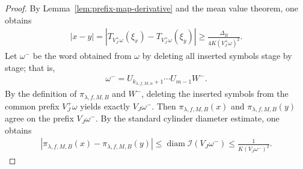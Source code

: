 \documentclass[10pt,a4paper]{amsart}
\begin{document}
\begin{proof}
By Lemma~\ref{lem:prefix-map-derivative} and the mean value theorem, one obtains
\begin{align}
\label{eq:x-y-lower-local-holder-revised}
    \left|x-y\right|
    =
    \left|T_{V^+_J\omega}(\xi_x)-T_{V^+_J\omega}(\xi_y)\right|
    \ge
    \frac{\Delta_B}{4K(V^+_J\omega)^2}.
\end{align}
Let $\omega^-$ be the word obtained from $\omega$ by deleting all
inserted symbols stage by stage; that is,
\begin{align*}
    \omega^-=U_{k_{\lambda,f,M,\alpha}+1}\cdots U_{m-1}W^-.
\end{align*}
By the definition of $\pi_{\lambda,f,M,B}$ and $W^-$, deleting the inserted symbols from the common prefix $V_J^+\omega$ yields exactly $V_J\omega^-$. Then $\pi_{\lambda,f,M,B}(x)$ and $\pi_{\lambda,f,M,B}(y)$ agree on the prefix $V_J\omega^-$. By the standard cylinder diameter estimate, one obtains 
\begin{align}
\label{eq:pi-x-y-upper-local-holder-revised}
    \left|\pi_{\lambda,f,M,B}(x)-\pi_{\lambda,f,M,B}(y)\right|
    \leq \operatorname{diam}{\mathcal{I}\!\left(V_J\omega^-\right)}
    \leq \frac{1}{K(V_J\omega^-)^2}.
\end{align}


\end{proof}
\end{document}

